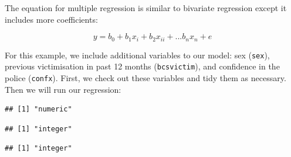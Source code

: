\documentclass[
]{book}
\newenvironment{Shaded}{\begin{snugshade}}{\end{snugshade}}
\newcommand{\AttributeTok}[1]{\textcolor[rgb]{0.77,0.63,0.00}{#1}}
\newcommand{\CommentTok}[1]{\textcolor[rgb]{0.56,0.35,0.01}{\textit{#1}}}
\newcommand{\ConstantTok}[1]{\textcolor[rgb]{0.00,0.00,0.00}{#1}}
\newcommand{\FunctionTok}[1]{\textcolor[rgb]{0.00,0.00,0.00}{#1}}
\newcommand{\NormalTok}[1]{#1}
\newcommand{\OtherTok}[1]{\textcolor[rgb]{0.56,0.35,0.01}{#1}}
\newcommand{\SpecialCharTok}[1]{\textcolor[rgb]{0.00,0.00,0.00}{#1}}
\newcommand{\StringTok}[1]{\textcolor[rgb]{0.31,0.60,0.02}{#1}}
\begin{document}
The equation for multiple regression is similar to bivariate regression except it includes more coefficients:

\[y = b_0 + b_1x_i + b_2x_{ii} +... b_nx_n + e\]

For this example, we include additional variables to our model: sex (\texttt{sex}), previous victimisation in past 12 months (\texttt{bcsvictim}), and confidence in the police (\texttt{confx}). First, we check out these variables and tidy them as necessary. Then we will run our regression:

\begin{Shaded}
\end{Shaded}

\begin{verbatim}
## [1] "numeric"
\end{verbatim}

\begin{Shaded}
\end{Shaded}

\begin{verbatim}
## [1] "integer"
\end{verbatim}

\begin{Shaded}
\end{Shaded}

\begin{verbatim}
## [1] "integer"
\end{verbatim}
\end{document}
